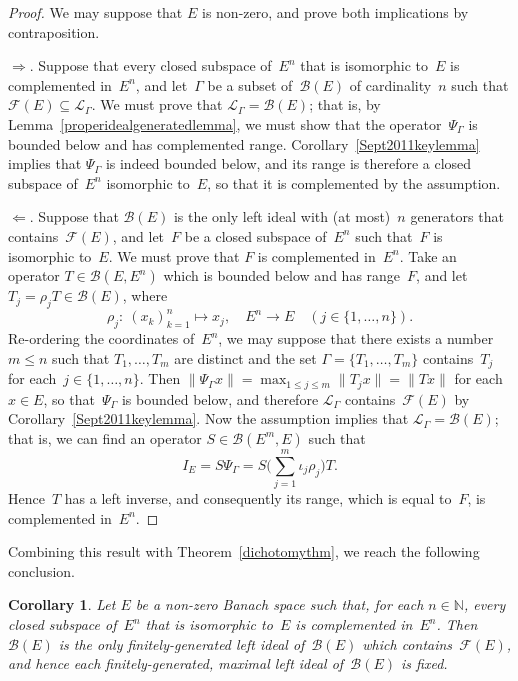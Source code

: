 \documentclass[12pt]{amsart}
\newtheorem{corollary}[theorem]{Corollary}
\theoremstyle{definition}
\numberwithin{equation}{section}
\begin{document}
\begin{proof} We may suppose that $E$ is non-zero, and prove both
  implications by contraposition. 

  $\Rightarrow$. Suppose that every closed subspace of~$E^n$ that is
  isomorphic to~$E$ is complemented in~$E^n$, and let~$\Gamma$ be a
  subset of~$\mathscr{B}(E)$ of cardinality~$n$ such that
  $\mathscr{F}(E)\subseteq \mathscr{L}_{\Gamma}$.  We must prove that
  $\mathscr{L}_{\Gamma} = \mathscr{B}(E)$; that is, by
  Lemma~\ref{properidealgeneratedlemma}, we must show that the
  operator~$\Psi_{\Gamma}$ is bounded below and has complemented
  range. Corollary~\ref{Sept2011keylemma} implies that $\Psi_{\Gamma}$
  is indeed bounded below, and its range is therefore a closed
  subspace of~$E^n$ isomorphic to~$E$, so that it is complemented by
  the assumption.

  $\Leftarrow$. Suppose that $\mathscr{B}(E)$ is the only left ideal
  with (at most)~$n$ generators that contains~$\mathscr{F}(E)$, and
  let~$F$ be a closed subspace of~$E^n$ such that~$F$ is isomorphic
  to~$E$.  We must prove that $F$ is complemented in~$E^n$. Take an
  operator $T\in\mathscr{B}(E, E^n)$ which is bounded below and has
  range~$F$, and let $T_j = \rho_j T\in\mathscr{B}(E)$, where
  \[ \rho_j\colon\ (x_k)_{k=1}^n\mapsto x_j,\quad E^n\to E\quad
  (j\in\{1,\ldots,n\}). \] Re-ordering the coordinates of~$E^n$, we
  may suppose that there exists a number \mbox{$m{\ensuremath{\leqslant}} n$} such that
  $T_1,\ldots,T_m$ are distinct and the set $\Gamma =
  \{T_1,\ldots,T_m\}$ contains~$T_j$ for
  each~$j\in\{1,\ldots,n\}$. Then \mbox{$\|\Psi_{\Gamma}x\| =
    \max_{1{\ensuremath{\leqslant}} j{\ensuremath{\leqslant}} m}\|T_jx\| = \|Tx\|$} for each $x\in E$, so
  that~$\Psi_\Gamma$ is bounded below, and there\-fore
  $\mathscr{L}_{\Gamma}$ contains~$\mathscr{F}(E)$ by
  Corollary~\ref{Sept2011keylemma}. Now the assump\-tion implies that
  \mbox{$\mathscr{L}_{\Gamma} = \mathscr{B}(E)$}; that is, we can find
  an operator $S\in\mathscr{B}(E^m,E)$ such that
  \[ I_E = S\Psi_\Gamma = S\biggl(\sum_{j=1}^m
  \iota_j\rho_j\biggr)T. \] Hence~$T$ has a left inverse,
  and consequently its range, which is equal to~$F$, is complemented
  in~$E^n$.  \end{proof}

Combining this result with Theorem~\ref{dichotomythm}, we reach the
following conclusion.

\begin{corollary}\label{noproperfgleftidealcontainsFE}
  Let $E$ be a non-zero Banach space such that, for each $n\in{\ensuremath{\mathbb{N}}}$,
  every closed subspace of~$E^n$ that is isomorphic to~$E$ is
  complemented in~$E^n$.  Then~$\mathscr{B}(E)$ is the only
  finitely-generated left ideal of~$\mathscr{B}(E)$ which
  contains~$\mathscr{F}(E)$, and hence each finitely-generated,
  maximal left ideal of~$\mathscr{B}(E)$ is fixed.
\end{corollary}
\end{document}
